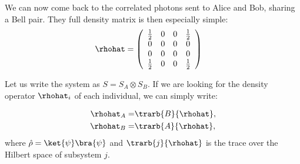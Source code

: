 We can now come back to the correlated photons sent to Alice and Bob, sharing a Bell pair. They full density matrix is then especially simple:
\begin{align}
  \rhohat &= \left(\begin{array}{cccc}
  \frac{1}{2}& 0& 0 &\frac{1}{2}\\
  0 & 0 & 0& 0\\
  0&0&0&0\\
    \frac{1}{2}&0&0&\frac{1}{2}
  \end{array}\right)
\end{align}

Let us write the system as $S = S_A \otimes S_B$.  If we are looking for the density operator $\rhohat_i$ of each individual, we can simply write:

\begin{align}
	\rhohat_A=&\trarb{B}{\rhohat},\\
				\rhohat_B=&\trarb{A}{\rhohat},
					\end{align}
					where $\hat{\rho}=\ket{\psi}\bra{\psi}$ and $\trarb{j}{\rhohat}$ is the trace over the Hilbert space of subsystem $j$.
